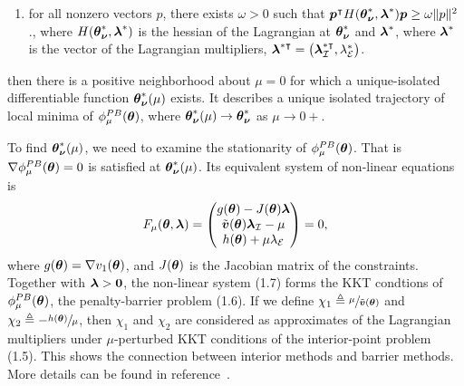 \begin{theorem}
\begin{enumerate}
\begin{enumerate}
			\item for all nonzero vectors $p$, there exists $\omega > 0$ such that $\boldsymbol{p}^{\intercal}H(\boldsymbol{\theta}_{\boldsymbol{\nu}}^*, \boldsymbol{\lambda}^*) \boldsymbol{p} \ge \omega \|p\|^2$., where $H(\boldsymbol{\theta}_{\boldsymbol{\nu}}^*, \boldsymbol{\lambda}^*) $ is the hessian of the Lagrangian at $\boldsymbol{\theta}_{\boldsymbol{\nu}}^*$ and $\boldsymbol{\lambda}^*$, where $\boldsymbol{\lambda}^*$ is the vector of the Lagrangian multipliers, $\boldsymbol{\lambda}^{*\intercal} =  \left(\boldsymbol{\lambda}_{\mathcal{I}}^{*\intercal}, \lambda_{\mathcal{E}}^*\right)$.
		\end{enumerate} 
		then there is a positive neighborhood about $\mu = 0$ for which a unique-isolated differentiable function $\boldsymbol{\theta}^*_{\boldsymbol{\nu}}(\mu)$ exists. It describes a unique isolated trajectory of local minima of $\phi_{\mu}^{PB}(\boldsymbol{\theta})$, where $\boldsymbol{\theta}^*_{\boldsymbol{\nu}}(\mu) \to \boldsymbol{\theta}^*_{\boldsymbol{\nu}}$ as $\mu \to 0+$.
	\end{enumerate}
\end{theorem}
To find $\boldsymbol{\theta}^*_{\boldsymbol{\nu}}(\mu)$, we need to examine the stationarity of $\phi_{\mu}^{PB}(\boldsymbol{\theta})$. That is $\nabla\phi_{\mu}^{PB}(\boldsymbol{\theta}) = 0$ is satisfied at $\boldsymbol{\theta}^*_{\boldsymbol{\nu}}(\mu)$. Its equivalent system of non-linear equations is
\begin{align}
F_{\mu}(\boldsymbol{\theta}, \boldsymbol{\lambda}) = 
\begin{pmatrix} g(\boldsymbol{\theta}) - J(\boldsymbol{\theta}) \boldsymbol{\lambda} \\ \tilde{\boldsymbol{v}}( \boldsymbol{\theta}) \boldsymbol{\lambda}_{\mathcal{I}} - \mu \\ h(\boldsymbol{\theta}) + \mu \lambda_{\mathcal{E}} \end{pmatrix} = 0,
\end{align}
where $g(\boldsymbol{\theta}) = \nabla v_1(\boldsymbol{\theta})$, and $J(\boldsymbol{\theta})$ is the Jacobian matrix of the constraints.\\

Together with $\boldsymbol{\lambda} > \boldsymbol{0}$, the non-linear system (1.7) forms the KKT condtions of $\phi^{PB}_{\mu}(\boldsymbol{\theta})$, the penalty-barrier problem (1.6). If we define $\chi_1 \triangleq \sfrac{\mu}{\tilde{\boldsymbol{v}}(\boldsymbol{\theta})}$ and $\chi_2 \triangleq - \sfrac{h(\boldsymbol{\theta})}{\mu}$, then $\chi_1$ and $\chi_2$ are considered as approximates of the Lagrangian multipliers under  $\mu$-perturbed KKT conditions of the interior-point problem (1.5). This shows the connection between interior methods and barrier methods. More details can be found in reference~\cite{NoceWrig06,fiacco,Forsgren2002}. \\

